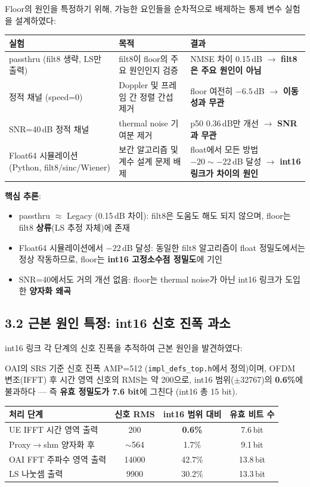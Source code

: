 \documentclass[11pt,a4paper]{article}
\begin{document}
Floor의 원인을 특정하기 위해, 가능한 요인들을 순차적으로 배제하는 통제 변수 실험을 설계하였다:

\begin{table}[h]\centering
\begin{tabular}{p{4.5cm}p{3.5cm}p{5.5cm}}
\toprule
실험 & 목적 & 결과 \\
\midrule
passthru (filt8 생략, LS만 출력) & filt8이 floor의 주요 원인인지 검증 & NMSE 차이 0.15\,dB $\to$ \textbf{filt8은 주요 원인이 아님} \\
\addlinespace
정적 채널 (speed=0) & Doppler 및 프레임 간 정렬 간섭 제거 & floor 여전히 $-6.5$\,dB $\to$ \textbf{이동성과 무관} \\
\addlinespace
SNR=40\,dB 정적 채널 & thermal noise 기여분 제거 & p50 0.36\,dB만 개선 $\to$ \textbf{SNR과 무관} \\
\addlinespace
Float64 시뮬레이션 (Python, filt8/sinc/Wiener) & 보간 알고리즘 및 계수 설계 문제 배제 & float에서 모든 방법 $-20\sim -22$\,dB 달성 $\to$ \textbf{int16 링크가 차이의 원인} \\
\bottomrule
\end{tabular}
\end{table}

\textbf{핵심 추론}:
\begin{itemize}[leftmargin=2em]
\item passthru $\approx$ Legacy (0.15\,dB 차이): filt8은 도움도 해도 되지 않으며, floor는 filt8 \textbf{상류}(LS 추정 자체)에 존재
\item Float64 시뮬레이션에서 $-22$\,dB 달성: 동일한 filt8 알고리즘이 float 정밀도에서는 정상 작동하므로, floor는 \textbf{int16 고정소수점 정밀도}에 기인
\item SNR=40에서도 거의 개선 없음: floor는 thermal noise가 아닌 int16 링크가 도입한 \textbf{양자화 왜곡}
\end{itemize}

\subsection{3.2 근본 원인 특정: int16 신호 진폭 과소}

int16 링크 각 단계의 신호 진폭을 추적하여 근본 원인을 발견하였다:

OAI의 SRS 기준 신호 진폭 AMP=512 (\texttt{impl\_defs\_top.h}에서 정의)이며, OFDM 변조(IFFT) 후 시간 영역 신호의 RMS는 약 200으로, int16 범위($\pm$32767)의 \textbf{0.6\%}에 불과하다 --- 즉 \textbf{유효 정밀도가 7.6 bit}에 그친다 (int16 총 15 bit).

\begin{table}[h]\centering
\begin{tabular}{lccc}
\toprule
처리 단계 & 신호 RMS & int16 범위 대비 & 유효 비트 수 \\
\midrule
UE IFFT 시간 영역 출력 & 200 & \textbf{0.6\%} & 7.6\,bit \\
Proxy$\to$shm 양자화 후 & $\sim$564 & 1.7\% & 9.1\,bit \\
OAI FFT 주파수 영역 출력 & 14000 & 42.7\% & 13.8\,bit \\
LS 나눗셈 출력 & 9900 & 30.2\% & 13.3\,bit \\
\bottomrule
\end{tabular}
\end{table}
\end{document}
